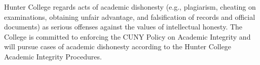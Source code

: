 Hunter College regards acts of academic dishonesty (e.g., plagiarism, cheating on examinations, obtaining unfair advantage, and falsification of records and official documents) as serious offenses against the values of intellectual honesty. The College is committed to enforcing the CUNY Policy on Academic Integrity and will pursue cases of academic dishonesty according to the Hunter College Academic Integrity Procedures.